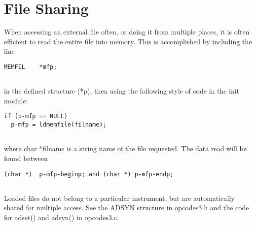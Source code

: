 \begin{comment}
\documentclass[10pt]{article}
\usepackage{fullpage, graphicx, url}
\setlength{\parskip}{1ex}
\setlength{\parindent}{0ex}
\title{File Sharing}



\begin{tabular}{ccc}
The Alternative Csound Reference Manual & & \\
Previous &Adding your own Cmodules to Csound &Next

\end{tabular}

\end{comment}
\section{File Sharing}


  When accessing an external file often, or doing it from multiple places, it is often efficient to read the entire file into memory. This is accomplished by including the line 


 
\begin{lstlisting}
MEMFIL    *mfp;
        
\end{lstlisting}


 


  in the defined structure (*p), then using the following style of code in the init module: 


 
\begin{lstlisting}
if (p-mfp == NULL)
  p-mfp = ldmemfile(filname);
        
\end{lstlisting}


 


  where char *filname is a string name of the file requested. The data read will be found between 


 
\begin{lstlisting}
(char *)  p-mfp-beginp; and (char *) p-mfp-endp;
        
\end{lstlisting}


 


  Loaded files do not belong to a particular instrument, but are automatically shared for multiple access. See the ADSYN structure in opcodes3.h and the code for adset() and adsyn() in opcodes3.c. 


\begin{comment}
\begin{tabular}{lcr}
Previous &Home &Next \\
Additional Space &Up &String arguments

\end{tabular}



\end{comment}
